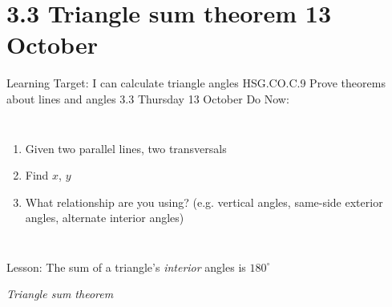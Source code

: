 \documentclass[onlytextwidth]{beamer}
\newcommand\paraticks{}
\def\paraticks{{Straight Barb[reversed, scale=2]}-{Straight Barb[scale=2]}}
\begin{document}
\section{3.3 Triangle sum theorem \hfill 13 October}
\begin{frame}{Learning Target: I can calculate triangle angles}
{HSG.CO.C.9 Prove theorems about lines and angles  \hfill \alert{3.3 Thursday 13 October}}
  Do Now: 
  \begin{columns}
    \begin{enumerate}
      \item Given two parallel lines, two transversals
      \item Find $x$, $y$
      \item What relationship are you using? (e.g. vertical angles, same-side exterior angles, alternate interior angles)
    \end{enumerate}
  \end{columns} \vspace{0.8cm}
  Lesson: The sum of a triangle's \emph{interior} angles is $180^\circ$ \par \medskip 
  \hspace{1.2cm} \emph{Triangle sum theorem}
\end{frame}
\end{document}
